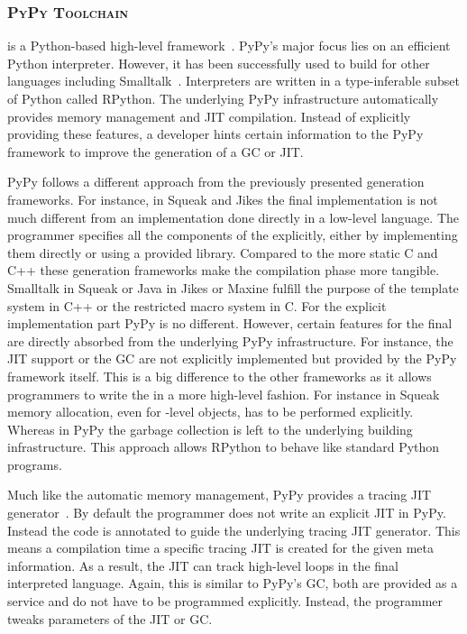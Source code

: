 \subsubsection*{\textsc{PyPy Toolchain}}
 is a Python-based high-level \VM framework~\cite{Rigo06a}.
PyPy's major focus lies on an efficient Python interpreter.
However, it has been successfully used to build \VMs for other languages including Smalltalk~\cite{Bolz08a}.
Interpreters are written in a type-inferable subset of Python called RPython.
The underlying PyPy infrastructure automatically provides memory management and JIT compilation.
Instead of explicitly providing these features, a \VM developer hints certain information to the PyPy framework to improve the generation of a GC or JIT.

PyPy follows a different approach from the previously presented \VM generation frameworks.
For instance, in Squeak and Jikes the final \VM implementation is not much different from an implementation done directly in a low-level language.
The programmer specifies all the components of the \VM explicitly, either by implementing them directly or using a provided library.
Compared to the more static C and C++ these \VM generation frameworks make the compilation phase more tangible.
Smalltalk in Squeak or Java in Jikes or Maxine fulfill the purpose of the template system in C++ or the restricted macro system in C.
For the explicit implementation part PyPy is no different.
However, certain features for the final \VM are directly absorbed from the underlying PyPy infrastructure.
For instance, the JIT support or the GC are not explicitly implemented but provided by the PyPy framework itself.
This is a big difference to the other \VM frameworks as it allows programmers to write the \VM in a more high-level fashion.
For instance in Squeak memory allocation, even for \VM-level objects, has to be performed explicitly.
Whereas in PyPy the garbage collection is left to the underlying \VM building infrastructure.
This approach allows RPython \VMs to behave like standard Python programs.

Much like the automatic memory management, PyPy provides a tracing JIT generator~\cite{Bolz09a}.
By default the \VM programmer does not write an explicit JIT in PyPy.
Instead the \VM code is annotated to guide the underlying tracing JIT generator.
This means a \VM compilation time a specific tracing JIT is created for the given meta information.
As a result, the JIT can track high-level loops in the final interpreted language.
Again, this is similar to PyPy's GC, both are provided as a service and do not have to be programmed explicitly.
Instead, the \VM programmer tweaks parameters of the JIT or GC.

